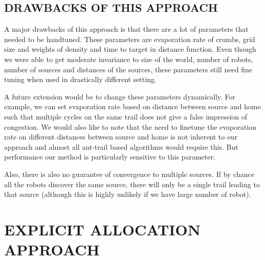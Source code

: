 \documentclass[letterpaper, 10 pt, conference]{ieeeconf}  %
\begin{document}
\subsection{DRAWBACKS OF THIS APPROACH} \label{ssec:drawbacks_of_1}

A major drawbacks of this approach is that there are a lot of parameters that needed to be handtuned. These parameters are evaporation rate of crumbs, grid size and weights of density and time to target in distance function. Even though we were able to get moderate invariance to size of the world, number of robots, number of sources and distances of the sources, these parameters still need fine tuning when used in drastically different setting.

A future extension would be to change these parameters dynamically. For example, we can set evaporation rate based on distance between source and home such that multiple cycles on the same trail does not give a false impression of congestion. We would also like to note that the need to finetune the evaporation rate on different distances between source and home is not inherent to our approach and almost all ant-trail based algorithms would require this. But  performance our method is particularly sensitive to this parameter.

Also, there is also no guarantee of convergence to multiple sources. If by chance all the robots discover the same source, there will only be a single trail leading to that source (although this is highly unlikely if we have large number of robot).

\section{EXPLICIT ALLOCATION APPROACH} 
\end{document}
